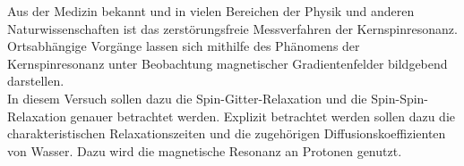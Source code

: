 Aus der Medizin bekannt und in vielen Bereichen der Physik und anderen
Naturwissenschaften ist das zerstörungsfreie Messverfahren der Kernspinresonanz.
Ortsabhängige Vorgänge lassen sich mithilfe des Phänomens der Kernspinresonanz
unter Beobachtung magnetischer Gradientenfelder bildgebend darstellen. \\
In diesem Versuch sollen dazu die Spin-Gitter-Relaxation und die
Spin-Spin-Relaxation genauer betrachtet werden. Explizit betrachtet werden
sollen dazu die charakteristischen Relaxationszeiten und die zugehörigen
Diffusionskoeffizienten von Wasser. Dazu wird die magnetische Resonanz an
Protonen genutzt.  
